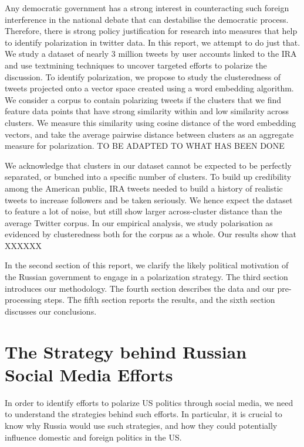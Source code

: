 \documentclass[12pt, authoryear]{elsarticle}
\begin{document}
Any democratic government has a strong interest in counteracting such foreign interference in the national debate that can destabilise the democratic process. Therefore, there is strong policy justification for research into measures that help to identify polarization in twitter data. In this report, we attempt to do just that. We study a dataset of nearly 3 million tweets by user accounts linked to the IRA and use textmining techniques to uncover targeted efforts to polarize the discussion. To identify polarization, we propose to study the clusteredness of tweets projected onto a vector space created using a word embedding algorithm. We consider a corpus to contain polarizing tweets if the clusters that we find feature data points that have strong similarity within and low similarity across clusters. We measure this similarity using cosine distance of the word embedding vectors, and take the average pairwise distance between clusters as an aggregate measure for polarization. TO BE ADAPTED TO WHAT HAS BEEN DONE

We acknowledge that clusters in our dataset cannot be expected to be perfectly separated, or bunched into a specific number of clusters. To build up credibility among the American public, IRA tweets needed to build a history of realistic tweets to increase followers and be taken seriously. We hence expect the dataset to feature a lot of noise, but still show larger across-cluster distance than the average Twitter corpus. In our empirical analysis, we study polarisation as evidenced by clusteredness both for the corpus as a whole. Our results show that XXXXXX

In the second section of this report, we clarify the likely political motivation of the Russian government to engage in a polarization strategy. The third section introduces our methodology. The fourth section describes the data and our pre-processing steps. The fifth section reports the results, and the sixth section discusses our conclusions.

\section{The Strategy behind Russian Social Media Efforts}\label{literature}

In order to identify efforts to polarize US politics through social media, we need to understand the strategies behind such efforts. In particular, it is crucial to know why Russia would use such strategies, and how they could potentially influence domestic and foreign politics in the US.
\end{document}
